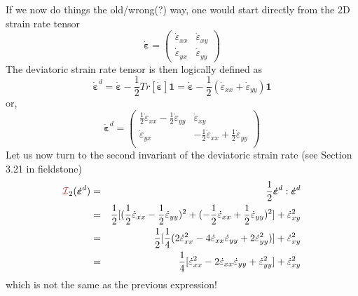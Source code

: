 {\color{darkgray}
If we now do things the old/wrong(?) way, one would start directly from the 2D strain rate tensor 
\[
\dot{\bm \varepsilon} = 
\left(
\begin{array}{cc}
\dot{\varepsilon}_{xx} & \dot{\varepsilon}_{xy}  \\
\dot{\varepsilon}_{yx} & \dot{\varepsilon}_{yy}  
\end{array}
\right)
\]
The deviatoric strain rate tensor is then logically defined as 
\[
\dot{\bm \varepsilon}^d 
= \dot{\bm \varepsilon} -\frac{1}{2} Tr[\dot{\bm \varepsilon}]   {\bm 1} 
= \dot{\bm \varepsilon} -\frac{1}{2} (\dot{\varepsilon}_{xx} +\dot{\varepsilon}_{yy}   )  {\bm 1} 
\]
or,
\[
\dot{\bm \varepsilon}^d = 
\left(
\begin{array}{cc}
\frac{1}{2}\dot{\varepsilon}_{xx} -\frac{1}{2}\dot{\varepsilon}_{yy} & \dot{\varepsilon}_{xy}  \\
\dot{\varepsilon}_{yx} & -\frac{1}{2}\dot{\varepsilon}_{xx} +\frac{1}{2} \dot{\varepsilon}_{yy}  \\
\end{array}
\right)
\]
Let us now turn to the second invariant of the deviatoric strain rate 
(see Section 3.21 in fieldstone)
\begin{eqnarray}
{\III}_2(\dot{\bm{\varepsilon}}^d)
&=& \frac{1}{2} \dot{\bm{\varepsilon}}^d:\dot{\bm{\varepsilon}}^d \nn\\
&=& \frac{1}{2}[ (\frac{1}{2}\dot{\varepsilon}_{xx} -\frac{1}{2}\dot{\varepsilon}_{yy})^2 + (-\frac{1}{2}\dot{\varepsilon}_{xx} +\frac{1}{2} \dot{\varepsilon}_{yy})^2  ] + \dot{\varepsilon}_{xy}^2 \nn\\
&=& \frac12 [ \frac14 (2\dot{\varepsilon}_{xx}^2  -4 \dot{\varepsilon}_{xx}\dot{\varepsilon}_{yy} +2\dot{\varepsilon}_{yy}^2 )  ] + \dot{\varepsilon}_{xy}^2 \nn\\
&=& \frac14 [ \dot{\varepsilon}_{xx}^2  -2 \dot{\varepsilon}_{xx}\dot{\varepsilon}_{yy} +\dot{\varepsilon}_{yy}^2   ] + \dot{\varepsilon}_{xy}^2 
\end{eqnarray}
which is not the same as the previous expression! 
}



